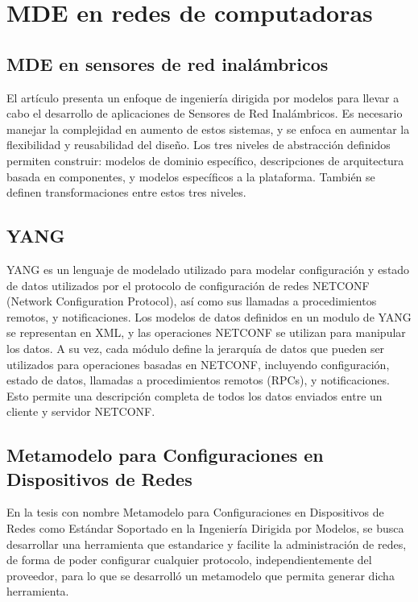 \section{MDE en redes de computadoras}
\subsection{MDE en sensores de red inalámbricos}
El artículo \cite{essaadi2017mde} presenta un enfoque de ingeniería dirigida por modelos para llevar a cabo el desarrollo de aplicaciones de Sensores de Red Inalámbricos. Es necesario manejar la complejidad en aumento de estos sistemas, y se enfoca en aumentar la flexibilidad y reusabilidad del diseño.
Los tres niveles de abstracción definidos permiten construir: modelos de dominio específico, descripciones de arquitectura basada en componentes, y modelos específicos a la plataforma. También se definen transformaciones entre estos tres niveles.

\subsection{YANG}
YANG es un lenguaje de modelado utilizado para modelar configuración y estado de datos utilizados por el protocolo de configuración de redes NETCONF (Network Configuration Protocol), así como sus llamadas a procedimientos remotos, y notificaciones.
Los modelos de datos definidos en un modulo de YANG se representan en XML, y las operaciones NETCONF se utilizan para manipular los datos.
A su vez, cada módulo define la jerarquía de datos que pueden ser utilizados para operaciones basadas en NETCONF, incluyendo configuración, estado de datos, llamadas a procedimientos remotos (RPCs), y notificaciones. Esto permite una descripción completa de todos los datos enviados entre un cliente y servidor NETCONF. \cite{bjorklund2010yang}

\subsection{Metamodelo para Configuraciones en Dispositivos de Redes}
En la tesis con nombre Metamodelo para Configuraciones en Dispositivos de Redes como Estándar Soportado en la Ingeniería Dirigida por Modelos, 
se busca desarrollar una herramienta que estandarice y facilite la administración de redes, de forma de poder configurar cualquier protocolo, independientemente del proveedor, para lo que se desarrolló un metamodelo que permita generar dicha herramienta.


